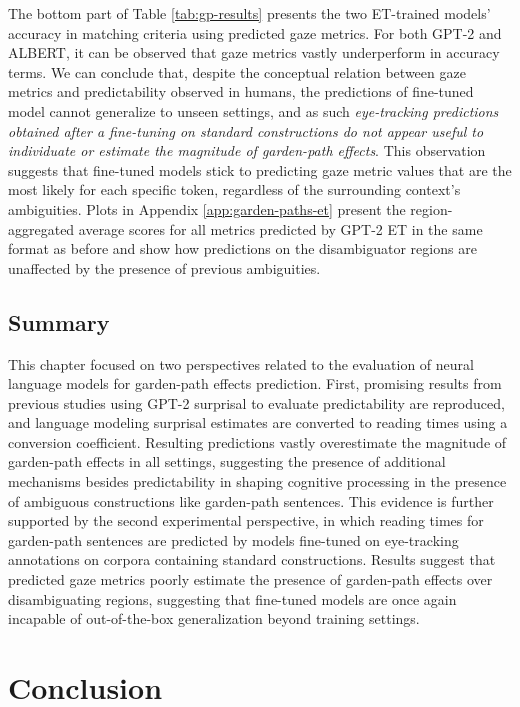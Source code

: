 \documentclass[a4paper, nobind]{templates/ociamthesis}
\begin{document}
The bottom part of Table \ref{tab:gp-results} presents the two ET-trained models' accuracy in matching criteria using predicted gaze metrics. For both GPT-2 and ALBERT, it can be observed that gaze metrics vastly underperform in accuracy terms. We can conclude that, despite the conceptual relation between gaze metrics and predictability observed in humans, the predictions of fine-tuned model cannot generalize to unseen settings, and as such \emph{eye-tracking predictions obtained after a fine-tuning on standard constructions do not appear useful to individuate or estimate the magnitude of garden-path effects}. This observation suggests that fine-tuned models stick to predicting gaze metric values that are the most likely for each specific token, regardless of the surrounding context's ambiguities. Plots in Appendix \ref{app:garden-paths-et} present the region-aggregated average scores for all metrics predicted by GPT-2 ET in the same format as before and show how predictions on the disambiguator regions are unaffected by the presence of previous ambiguities.

\hypertarget{subchap:ex3-summary}{%
\section{Summary}\label{subchap:ex3-summary}}

This chapter focused on two perspectives related to the evaluation of neural language models for garden-path effects prediction. First, promising results from previous studies using GPT-2 surprisal to evaluate predictability are reproduced, and language modeling surprisal estimates are converted to reading times using a conversion coefficient. Resulting predictions vastly overestimate the magnitude of garden-path effects in all settings, suggesting the presence of additional mechanisms besides predictability in shaping cognitive processing in the presence of ambiguous constructions like garden-path sentences. This evidence is further supported by the second experimental perspective, in which reading times for garden-path sentences are predicted by models fine-tuned on eye-tracking annotations on corpora containing standard constructions. Results suggest that predicted gaze metrics poorly estimate the presence of garden-path effects over disambiguating regions, suggesting that fine-tuned models are once again incapable of out-of-the-box generalization beyond training settings.

\hypertarget{conclusion}{%
\chapter*{\texorpdfstring{\textbf{Conclusion}}{Conclusion}}\label{conclusion}}
\end{document}
